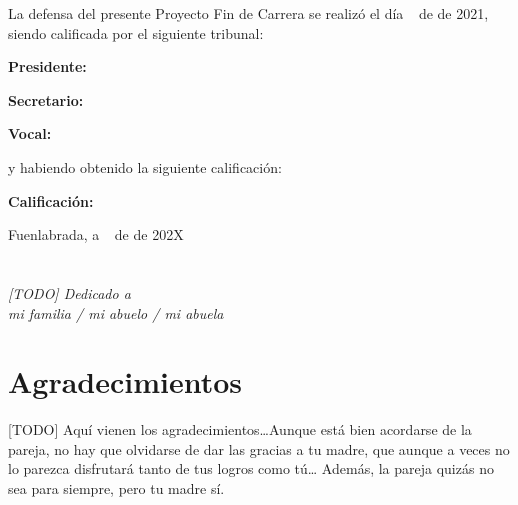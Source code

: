 \documentclass[a4paper, 12pt]{book}
\begin{document}
\vspace{1cm}
La defensa del presente Proyecto Fin de Carrera se realizó el día \qquad$\;\,$ de \qquad\qquad\qquad\qquad \newline de 2021, siendo calificada por el siguiente tribunal:


\vspace{0.5cm}
\textbf{Presidente:}

\vspace{1.2cm}
\textbf{Secretario:}

\vspace{1.2cm}
\textbf{Vocal:}


\vspace{1.2cm}
y habiendo obtenido la siguiente calificación:

\vspace{1cm}
\textbf{Calificación:}


\vspace{1cm}
\begin{flushright}
Fuenlabrada, a \qquad$\;\,$ de \qquad\qquad\qquad\qquad de 202X
\end{flushright}


\chapter*{}
\begin{flushright}
\textit{[TODO] Dedicado a \\
mi familia / mi abuelo / mi abuela}
\end{flushright}


\chapter*{Agradecimientos}

[TODO] Aquí vienen los agradecimientos\ldots Aunque está bien acordarse de la pareja, no hay que olvidarse de dar las gracias a tu madre, que aunque a veces no lo parezca disfrutará tanto de tus logros como tú\ldots 
Además, la pareja quizás no sea para siempre, pero tu madre sí.
\end{document}

